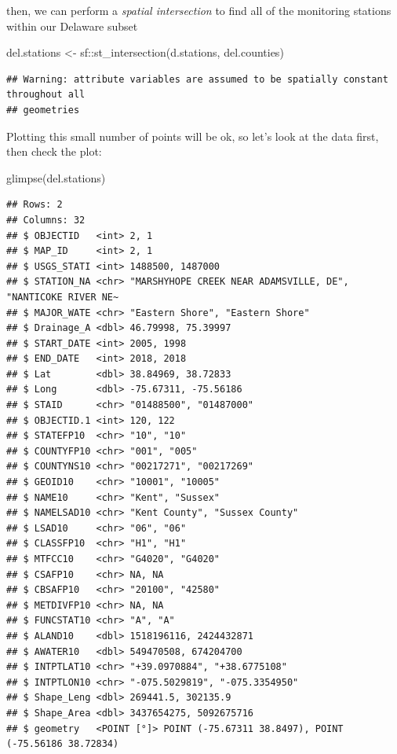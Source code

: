 \documentclass[]{article}
\newenvironment{Shaded}{\begin{snugshade}}{\end{snugshade}}
\newcommand{\FunctionTok}[1]{\textcolor[rgb]{0.00,0.00,0.00}{#1}}
\newcommand{\NormalTok}[1]{#1}
\newcommand{\OtherTok}[1]{\textcolor[rgb]{0.56,0.35,0.01}{#1}}
\newcommand{\SpecialCharTok}[1]{\textcolor[rgb]{0.00,0.00,0.00}{#1}}
\begin{document}
then, we can perform a \emph{spatial intersection} to find all of the
monitoring stations within our Delaware subset

\begin{Shaded}
\begin{Highlighting}[]
\NormalTok{del.stations }\OtherTok{\textless{}{-}}\NormalTok{ sf}\SpecialCharTok{::}\FunctionTok{st\_intersection}\NormalTok{(d.stations, del.counties)}
\end{Highlighting}
\end{Shaded}

\begin{verbatim}
## Warning: attribute variables are assumed to be spatially constant throughout all
## geometries
\end{verbatim}

Plotting this small number of points will be ok, so let's look at the
data first, then check the plot:

\begin{Shaded}
\begin{Highlighting}[]
\FunctionTok{glimpse}\NormalTok{(del.stations)}
\end{Highlighting}
\end{Shaded}

\begin{verbatim}
## Rows: 2
## Columns: 32
## $ OBJECTID   <int> 2, 1
## $ MAP_ID     <int> 2, 1
## $ USGS_STATI <int> 1488500, 1487000
## $ STATION_NA <chr> "MARSHYHOPE CREEK NEAR ADAMSVILLE, DE", "NANTICOKE RIVER NE~
## $ MAJOR_WATE <chr> "Eastern Shore", "Eastern Shore"
## $ Drainage_A <dbl> 46.79998, 75.39997
## $ START_DATE <int> 2005, 1998
## $ END_DATE   <int> 2018, 2018
## $ Lat        <dbl> 38.84969, 38.72833
## $ Long       <dbl> -75.67311, -75.56186
## $ STAID      <chr> "01488500", "01487000"
## $ OBJECTID.1 <int> 120, 122
## $ STATEFP10  <chr> "10", "10"
## $ COUNTYFP10 <chr> "001", "005"
## $ COUNTYNS10 <chr> "00217271", "00217269"
## $ GEOID10    <chr> "10001", "10005"
## $ NAME10     <chr> "Kent", "Sussex"
## $ NAMELSAD10 <chr> "Kent County", "Sussex County"
## $ LSAD10     <chr> "06", "06"
## $ CLASSFP10  <chr> "H1", "H1"
## $ MTFCC10    <chr> "G4020", "G4020"
## $ CSAFP10    <chr> NA, NA
## $ CBSAFP10   <chr> "20100", "42580"
## $ METDIVFP10 <chr> NA, NA
## $ FUNCSTAT10 <chr> "A", "A"
## $ ALAND10    <dbl> 1518196116, 2424432871
## $ AWATER10   <dbl> 549470508, 674204700
## $ INTPTLAT10 <chr> "+39.0970884", "+38.6775108"
## $ INTPTLON10 <chr> "-075.5029819", "-075.3354950"
## $ Shape_Leng <dbl> 269441.5, 302135.9
## $ Shape_Area <dbl> 3437654275, 5092675716
## $ geometry   <POINT [°]> POINT (-75.67311 38.8497), POINT (-75.56186 38.72834)
\end{verbatim}
\end{document}
